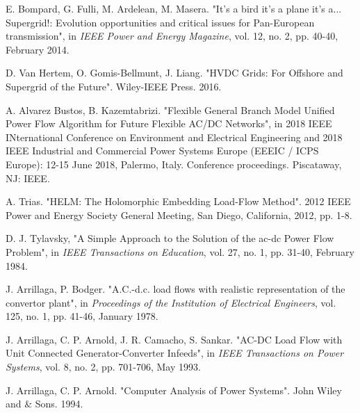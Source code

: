 \documentclass[conference]{IEEEtran}
\begin{document}
%
%
%
\begin{thebibliography}{1}
E. Bompard, G. Fulli, M. Ardelean, M. Masera. "It's a bird it's a plane it's a... Supergrid!: Evolution opportunities and critical issues for Pan-European transmission", in \emph{IEEE Power and Energy Magazine}, vol. 12, no. 2, pp. 40-40, February 2014.

D. Van Hertem, O. Gomis-Bellmunt, J. Liang. "HVDC Grids: For Offshore and Supergrid of the Future". Wiley-IEEE Press. 2016.

A. Alvarez Bustos, B. Kazemtabrizi. "Flexible General Branch Model Unified Power Flow Algorithm for Future Flexible AC/DC Networks", in 2018 IEEE INternational Conference on Environment and Electrical Engineering and 2018 IEEE Industrial and Commercial Power Systems Europe (EEEIC / ICPS Europe): 12-15 June 2018, Palermo, Italy. Conference proceedings. Piscataway, NJ: IEEE.

A. Trias. "HELM: The Holomorphic Embedding Load-Flow Method". 2012 IEEE Power and Energy Society General Meeting, San Diego, California, 2012, pp. 1-8.

D. J. Tylavsky, "A Simple Approach to the Solution of the ac-dc Power Flow Problem", in \emph{IEEE Transactions on Education}, vol. 27, no. 1, pp. 31-40, February 1984.

J. Arrillaga, P. Bodger. "A.C.-d.c. load flows with realistic representation of the convertor plant", in \emph{Proceedings of the Institution of Electrical Engineers}, vol. 125, no. 1, pp. 41-46, January 1978.

J. Arrillaga, C. P. Arnold, J. R. Camacho, S. Sankar. "AC-DC Load Flow with Unit Connected Generator-Converter Infeeds", in \emph{IEEE Transactions on Power Systems}, vol. 8, no. 2, pp. 701-706, May 1993. 

J. Arrillaga, C. P. Arnold. "Computer Analysis of Power Systems". John Wiley and \& Sons. 1994.


\end{thebibliography}
\end{document}
